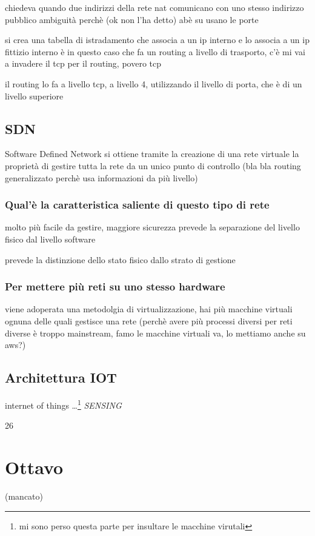 \documentclass[11pt]{article}
\begin{document}
chiedeva quando due indirizzi della rete nat comunicano con uno stesso indirizzo pubblico
ambiguità perchè (ok non l'ha detto)
abè su usano le porte

si crea una tabella di istradamento che associa a un ip interno e lo associa a un ip fittizio interno
è in questo caso che fa un routing a livello di trasporto, c'è mi vai a invadere il tcp per il routing, povero tcp

il routing lo fa a livello tcp, a livello 4, utilizzando il livello di porta, che è di un livello superiore

\subsection{SDN}
\label{sec:orgbae07ce}
Software Defined Network
si ottiene tramite la creazione di una rete virtuale la proprietà di gestire tutta la rete da un unico punto di controllo
(bla bla routing generalizzato perchè usa informazioni da più livello)

\subsubsection{Qual'è la caratteristica saliente di questo tipo di rete}
\label{sec:org0905fb1}
molto più facile da gestire, maggiore sicurezza
prevede la separazione del livello fisico dal livello software

prevede la distinzione dello stato fisico dallo strato di gestione

\subsubsection{Per mettere più reti su uno stesso hardware}
\label{sec:org522d904}
viene adoperata una metodolgia di virtualizzazione, hai più macchine virtuali ognuna delle quali gestisce una rete (perchè avere più processi diversi per reti diverse è troppo mainstream, famo le macchine virtuali va, lo mettiamo anche su aws?)

\subsection{Architettura IOT}
\label{sec:orgcbcd040}
internet of things
\ldots{}\footnote{mi sono perso questa parte per insultare le macchine virutali}
\emph{SENSING}

26

\section{Ottavo}
\label{sec:orgf016c37}
(mancato)
\end{document}
